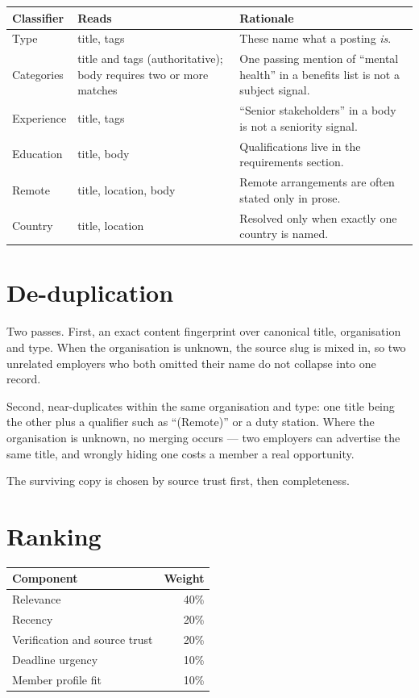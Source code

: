 \documentclass[11pt,a4paper]{report}
\newcommand{\dash}{---}
\begin{document}
\begin{center}
\begin{tabularx}{\textwidth}{@{}llX@{}}
\toprule
\textbf{Classifier} & \textbf{Reads} & \textbf{Rationale} \\
\midrule
Type & title, tags & These name what a posting \emph{is}. \\
Categories & title and tags (authoritative); body requires two or more matches
& One passing mention of ``mental health'' in a benefits list is not a subject
signal. \\
Experience & title, tags & ``Senior stakeholders'' in a body is not a seniority
signal. \\
Education & title, body & Qualifications live in the requirements section. \\
Remote & title, location, body & Remote arrangements are often stated only in
prose. \\
Country & title, location & Resolved only when exactly one country is named. \\
\bottomrule
\end{tabularx}
\end{center}

\section{De-duplication}

Two passes. First, an exact content fingerprint over canonical title,
organisation and type. When the organisation is unknown, the source slug is
mixed in, so two unrelated employers who both omitted their name do not collapse
into one record.

Second, near-duplicates within the same organisation and type: one title being
the other plus a qualifier such as ``(Remote)'' or a duty station. Where the
organisation is unknown, no merging occurs \dash{} two employers can advertise
the same title, and wrongly hiding one costs a member a real opportunity.

The surviving copy is chosen by source trust first, then completeness.

\section{Ranking}

\begin{center}
\begin{tabular}{@{}lr@{}}
\toprule
\textbf{Component} & \textbf{Weight} \\
\midrule
Relevance & 40\% \\
Recency & 20\% \\
Verification and source trust & 20\% \\
Deadline urgency & 10\% \\
Member profile fit & 10\% \\
\bottomrule
\end{tabular}
\end{center}
\end{document}
